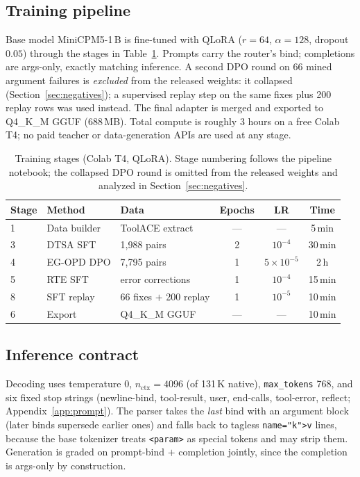 \documentclass[11pt]{article}
\newcommand{\code}[1]{\texttt{#1}}
\begin{document}
\subsection{Training pipeline}
\label{sec:training}

Base model MiniCPM5-1\,B is fine-tuned with QLoRA ($r{=}64$, $\alpha{=}128$,
dropout $0.05$) through the stages in Table~\ref{tab:stages}. Prompts carry the
router's bind; completions are args-only, exactly matching inference. A second
DPO round on 66 mined argument failures is \emph{excluded} from the released
weights: it collapsed (Section~\ref{sec:negatives}); a supervised replay step
on the same fixes plus 200 replay rows was used instead. The final adapter is
merged and exported to Q4\_K\_M GGUF (688\,MB). Total compute is roughly 3 hours
on a free Colab T4; no paid teacher or data-generation APIs are used at any
stage.

\vspace{1em}
\begin{table}[t]
  \centering
  \caption{Training stages (Colab T4, QLoRA). Stage numbering follows
    the pipeline notebook; the collapsed DPO round is omitted from the
    released weights and analyzed in Section~\ref{sec:negatives}.}
  \label{tab:stages}
  \begin{tabular}{lllccc}
    \toprule
    Stage & Method & Data & Epochs & LR & Time \\
    \midrule
    1 & Data builder & ToolACE extract & --- & --- & 5\,min \\
    3 & DTSA SFT & 1,988 pairs & 2 & $10^{-4}$ & 30\,min \\
    4 & EG-OPD DPO & 7,795 pairs & 1 & $5{\times}10^{-5}$ & 2\,h \\
    5 & RTE SFT & error corrections & 1 & $10^{-4}$ & 15\,min \\
    8 & SFT replay & 66 fixes $+$ 200 replay & 1 & $10^{-5}$ & 10\,min \\
    6 & Export & Q4\_K\_M GGUF & --- & --- & 10\,min \\
    \bottomrule
  \end{tabular}
\end{table}

\subsection{Inference contract}
\label{sec:inference}

Decoding uses temperature 0, $n_{\mathrm{ctx}}{=}4096$ (of 131\,K native),
\code{max\_tokens} 768, and six fixed stop strings (newline-bind, tool-result,
user, end-calls, tool-error, reflect; Appendix~\ref{app:prompt}). The parser
takes the \emph{last} bind with an argument block (later binds supersede
earlier ones) and falls back to tagless \code{name="k">v} lines, because the
base tokenizer treats \code{<param>} as special tokens and may strip them.
Generation is graded on prompt-bind $+$ completion jointly, since the completion
is args-only by construction.
\end{document}
